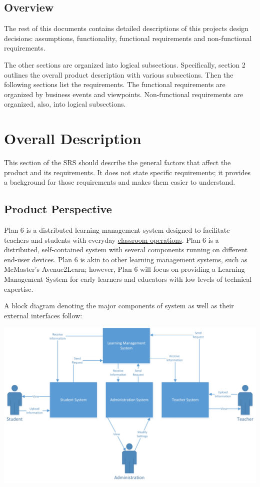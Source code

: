 \documentclass[]{article}
\begin{document}
\subsection{Overview}
\label{sub:overview}
The rest of this documents contains detailed descriptions of this projects
design decisions: assumptions, functionality, functional requirements and
non-functional requirements.

The other sections are organized into logical subsections. Specifically, section
2 outlines the overall product description with various subsections. Then the
following sections list the requirements. The functional requirements are
organized by business events and viewpoints. Non-functional requirements are
organized, also, into logical subsections.




\section{Overall Description}
\label{sec:overall_description}

This section of the SRS should describe the general factors that affect the 
product and its requirements. It does not state specific requirements; it 
provides a background for those requirements and makes them easier to 
understand.

\subsection{Product Perspective}
\label{sub:product_perspective}
Plan 6 is a distributed learning management system designed to facilitate 
teachers and students with everyday \underline{classroom operations}. Plan 6 is a 
distributed, self-contained system with several components running on different 
end-user devices. Plan 6 is akin to other learning management systems, such as 
McMaster's Avenue2Learn; however, Plan 6 will focus on providing a Learning 
Management System for early learners and educators with low levels of technical 
expertise. 

A block diagram denoting the major components of system as well as their 
external interfaces follow:

\begin{center}
\includegraphics[scale=0.7]{A1_Assets/2-1_Product_Perspective_Diagram.jpg}
\end{center}
\end{document}
